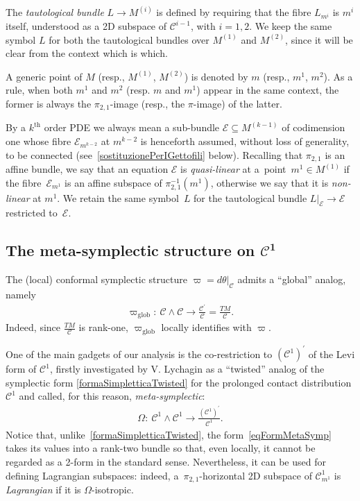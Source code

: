 \documentclass[10pt,a4paper]{amsart}
\newcommand{\C}{\mathcal{C}}
\newcommand{\E}{\mathcal{E}}
\newcommand{\Th}{^\textrm{th}}
\numberwithin{equation}{section}
\begin{document}
The \emph{tautological bundle} $L\rightarrow M^{(i)}$
is def\/ined by requiring that the f\/ibre $L_{m^i}$ is $m^i$ itself, understood as a 2D subspace of $\C^{i-1}$, with $i=1,2$. We keep the same symbol $L$ for both the tautological bundles over $M^{(1)}$ and $M^{(2)}$, since it will be clear from the context which is which.

A generic point of $M$ (resp., $M ^{(1)}$, $M ^{(2)}$) is denoted by $m$ (resp., $m^1$, $m^2$). As a rule, when both $m^1$ and $m^2$ (resp. $m$ and $m^1$) appear in the same context, the former is always the $\pi_{2,1}$-image (resp., the $\pi$-image) of the latter.

By a $k\Th$ order PDE we always mean a sub-bundle $\E\subseteq M^{(k-1)}$ of codimension one whose f\/ibre $\E_{m^{k-2}}$ at $m^{k-2}$ is henceforth assumed, without loss of generality, to be connected (see~\eqref{sostituzionePerIGettofili} below). Recalling that $\pi_{2,1}$ is an af\/f\/ine bundle, we say that an equation $\E$ is \emph{quasi-linear} at a~point~$m^1\in M^{(1)}$ if the f\/ibre~$\E_{m^1}$ is an af\/f\/ine subspace of $\pi_{2,1}^{-1}(m^1)$, otherwise we say that it is \emph{non-linear} at $m^1$.
We retain the same symbol~$L$ for the tautological bundle $L|_\E\longrightarrow \E$ restricted to~$\E$.

\subsection[The meta-symplectic structure on $\C^1$]{The meta-symplectic structure on $\boldsymbol{\C^1}$}\label{subMetaSim}

The (local) conformal symplectic structure $\varpi=d\theta|_{\C}$ admits a ``global'' analog, namely
\begin{gather}\label{formaSimpletticaTwisted}
\varpi_{\textrm{glob}}\colon \ \C\wedge\C\longrightarrow \frac{\C^\prime}{\C}=\frac{TM}{\C}.
\end{gather}
Indeed,
since
$\frac{TM}{\C} $ is rank-one, $\varpi_{\textrm{glob}}$ locally identif\/ies with $\varpi$.

One of the main gadgets of our analysis is the co-restriction to $(\C^{1})^\prime$ of the Levi form of $\C^1$, f\/irstly investigated by V. Lychagin \cite{MR2389645} as a ``twisted'' analog of the symplectic form \eqref{formaSimpletticaTwisted} for the prolonged contact distribution $\C^1$ and called, for this reason, \emph{meta-symplectic}:
\begin{gather}\label{eqFormMetaSymp}
\Omega\colon \ \C^{1}\wedge\C^{1}\longrightarrow \frac{(\C^{1})^\prime}{\C^{1}}.
\end{gather}
Notice that,
unlike~\eqref{formaSimpletticaTwisted}, the form~\eqref{eqFormMetaSymp} takes its values into a rank-two bundle so that, even locally, it cannot be regarded as a 2-form in the standard sense. Nevertheless, it can be used for def\/ining Lagrangian subspaces: indeed, a~$\pi_{2,1}$-horizontal 2D subspace of $\C_{m^1}^1$ is \emph{Lagrangian} if it is $\Omega$-isotropic.
\end{document}

